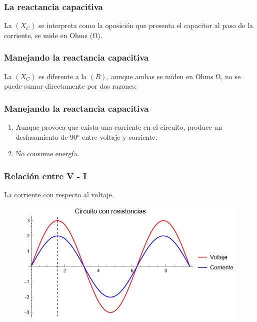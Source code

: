 \documentclass[14pt]{beamer}
\begin{document}
\begin{frame}
\frametitle{La reactancia capacitiva}
La  $(X_{C})$ se interpreta como la oposición que presenta el capacitor al paso de la corriente, \pause se mide en Ohms (\si{\ohm}).
\end{frame}
\begin{frame}
\frametitle{Manejando la reactancia capacitiva}
La  $(X_{C})$ es diferente a la  $(R)$, \pause aunque ambas se miden en Ohms $\si{\ohm}$, no se puede sumar directamente por dos razones:
\end{frame}
\begin{frame}
\frametitle{Manejando la reactancia capacitiva}
\begin{enumerate}[<+->]
\item Aunque provoca que exista una corriente en el circuito, produce un desfasamiento de \ang{90} entre voltaje y corriente.
\item No consume energía.
\end{enumerate}
\end{frame}
\begin{frame}
\frametitle{Relación entre V - I}
\vspace*{-1cm}
La corriente  con respecto al voltaje.
\begin{figure}
    \centering
    \includegraphics[scale=0.6]{Imagenes/Circuitos_IV_01.png}
\end{figure}
\end{frame}
\end{document}
